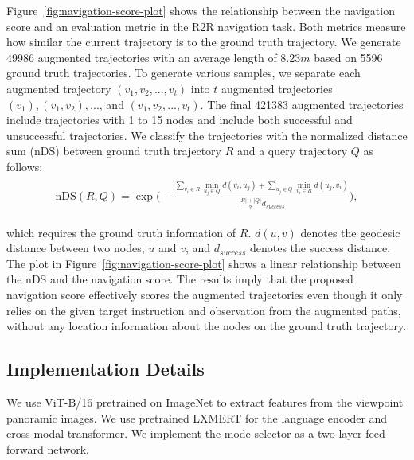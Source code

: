 \documentclass[10pt,twocolumn,letterpaper]{article}
\begin{document}
\renewcommand{\baselinestretch}{1.5}
Figure~\ref{fig:navigation-score-plot} shows the relationship between the navigation score and an evaluation metric in the R2R navigation task. Both metrics measure how similar the current trajectory is to the ground truth trajectory. We generate \num[group-separator={,}]{49986} augmented trajectories with an average length of $8.23 m$ based on \num[group-separator={,}]{5596} ground truth trajectories. To generate various samples, we separate each augmented trajectory $(v_1, v_2, ..., v_t)$ into $t$ augmented trajectories $(v_1), (v_1, v_2), ...$, and $(v_1, v_2, ..., v_t)$. The final \num[group-separator={,}]{421383} augmented trajectories include trajectories with 1 to 15 nodes and include both successful and unsuccessful trajectories. We classify the trajectories with the normalized distance sum (nDS) between ground truth trajectory $R$ and a query trajectory $Q$ as follows:
{\scriptsize	
\begin{align}\label{eq:nds}
    \begin{split}
        \text{nDS}(R, Q) = \exp{\Bigg(-\frac{\displaystyle \sum_{v_i \in R}{\min_{u_j \in Q}{d(v_i, u_j)}} + \sum_{u_j \in Q}{\min_{v_i \in R}{d(u_j, v_i)}}}{\frac{|R|+|Q|}{2}d_{success}}\Bigg)},
    \end{split}
\end{align}
}
\renewcommand{\baselinestretch}{1}

\noindent which requires the ground truth information of $R$. $d(u,v)$ denotes the geodesic distance between two nodes, $u$ and $v$, and $d_{success}$ denotes the success distance. The plot in Figure~\ref{fig:navigation-score-plot} shows a linear relationship between the nDS and the navigation score. The results imply that the proposed navigation score effectively scores the augmented trajectories even though it only relies on the given target instruction and observation from the augmented paths, without any location information about the nodes on the ground truth trajectory. 

\subsection{Implementation Details}
We use ViT-B/16 \cite{dosovitskiy2020vit} pretrained on ImageNet to extract
features from the viewpoint panoramic images. We use pretrained LXMERT \cite{tan2019lxmert} for the language encoder and cross-modal transformer. We implement the mode selector as a two-layer feed-forward network.
\end{document}
